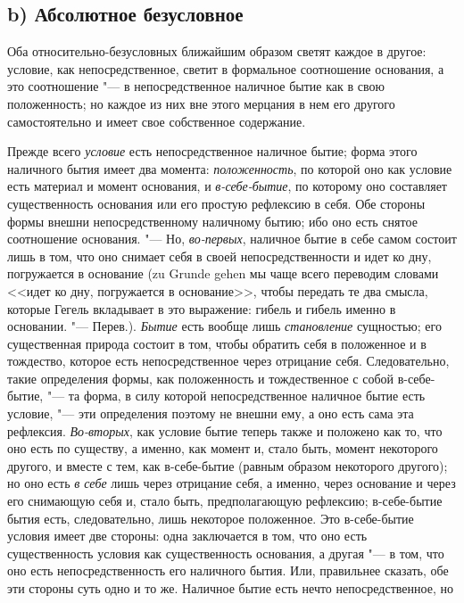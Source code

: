 \subsection[b) Абсолютное безусловное]{b) Абсолютное безусловное}

Оба относительно-безусловных ближайшим образом
светят каждое в другое: условие, как непосредственное, светит в формальное
соотношение основания, а это соотношение "--- в непосредственное наличное
бытие как в свою положенность; но каждое из них вне этого мерцания в нем
его другого самостоятельно и имеет свое собственное содержание.

Прежде всего {\em условие} есть непосредственное
наличное бытие; форма этого наличного бытия имеет два момента:
{\em положенность}, по которой оно как условие есть
материал и момент основания, и {\em в-себе-бытие}, по
которому оно составляет существенность основания или его простую рефлексию
в себя. Обе стороны формы внешни непосредственному наличному бытию; ибо оно
есть снятое соотношение основания. "--- Но,
{\em во-первых}, наличное бытие в себе самом состоит
лишь в том, что оно снимает себя в своей непосредственности и идет ко дну,
погружается в основание (zu Grunde gehen мы чаще всего переводим словами
<<идет ко дну, погружается в основание>>, чтобы передать те два смысла,
которые Гегель вкладывает в это выражение: гибель и гибель именно в
основании. "--- Перев.). {\em Бытие} есть вообще лишь
{\em становление} сущностью; его существенная природа
состоит в том, чтобы обратить себя в положенное и в тождество, которое есть
непосредственное через отрицание себя. Следовательно, такие определения
формы, как положенность и тождественное с собой в-себе-бытие, "--- та форма, в
силу которой непосредственное наличное бытие есть условие, "--- эти
определения поэтому не внешни ему, а оно есть сама эта рефлексия.
{\em Во-вторых}, как условие бытие теперь также и
положено как то, что оно есть по существу, а именно, как момент и, стало
быть, момент некоторого другого, и вместе с тем, как в-себе-бытие (равным
образом некоторого другого); но оно есть {\em в себе}
лишь через отрицание себя, а именно, через основание и через его снимающую
себя и, стало быть, предполагающую рефлексию; в-себе-бытие бытия есть,
следовательно, лишь некоторое положенное. Это в-себе-бытие условия имеет
две стороны: одна заключается в том, что оно есть существенность условия
как существенность основания, а другая "--- в том, что оно есть
непосредственность его наличного бытия. Или, правильнее сказать, обе эти
стороны суть одно и то же. Наличное бытие есть нечто непосредственное, но
